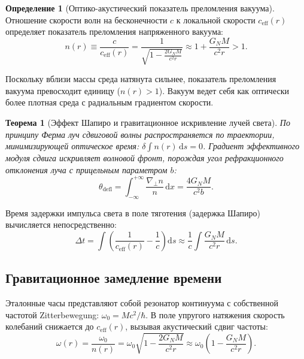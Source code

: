 \documentclass[11pt,a4paper]{article}
\newtheorem{theorem}{Теорема}
\theoremstyle{definition}
\newtheorem{definition}{Определение}
\theoremstyle{remark}
\begin{document}
\begin{definition}[Оптико-акустический показатель преломления вакуума]
	Отношение скорости волн на бесконечности $c$ к локальной скорости $c_{\mathrm{eff}}(r)$ определяет показатель преломления напряженного вакуума:
	\begin{equation}
		n(r) \equiv \frac{c}{c_{\mathrm{eff}}(r)} = \frac{1}{\sqrt{1 - \frac{2 G_N M}{c^2 r}}} \approx 1 + \frac{G_N M}{c^2 r} > 1.
		\label{eq:refractive_index_exact}
	\end{equation}
\end{definition}

Поскольку вблизи массы среда натянута сильнее, показатель преломления вакуума превосходит единицу ($n(r) > 1$). Вакуум ведет себя как оптически более плотная среда с радиальным градиентом скорости.

\begin{theorem}[Эффект Шапиро и гравитационное искривление лучей света]
	\label{thm:shapiro_deflection_exact}
	По принципу Ферма луч сдвиговой волны распространяется по траектории, минимизирующей оптическое время: $\delta \int n(r) \, \mathrm{d}s = 0$. Градиент эффективного модуля сдвига искривляет волновой фронт, порождая угол рефракционного отклонения луча с прицельным параметром $b$:
	\begin{equation}
		\theta_{\mathrm{defl}} = \int_{-\infty}^{+\infty} \frac{\nabla_\perp n}{n} \, \mathrm{d}x = \frac{4 G_N M}{c^2 b}.
		\label{eq:shapiro_deflection_formula}
	\end{equation}
\end{theorem}
Время задержки импульса света в поле тяготения (задержка Шапиро) вычисляется непосредственно:
\begin{equation}
	\Delta t = \int \left( \frac{1}{c_{\mathrm{eff}}(r)} - \frac{1}{c} \right) \mathrm{d}s \approx \frac{1}{c} \int \frac{G_N M}{c^2 r} \, \mathrm{d}s.
	\label{eq:shapiro_time_delay}
\end{equation}

\subsection{Гравитационное замедление времени}

Эталонные часы представляют собой резонатор континуума с собственной частотой Zitterbewegung: $\omega_0 = M c^2 / \hbar$. В поле упругого натяжения скорость колебаний снижается до $c_{\mathrm{eff}}(r)$, вызывая акустический сдвиг частоты:
\begin{equation}
	\omega(r) = \frac{\omega_0}{n(r)} = \omega_0 \sqrt{1 - \frac{2 G_N M}{c^2 r}} \approx \omega_0 \left( 1 - \frac{G_N M}{c^2 r} \right).
	\label{eq:clock_redshift_exact}
\end{equation}
\end{document}
